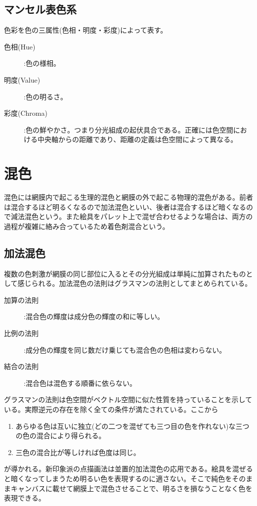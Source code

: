 \documentclass{jsarticle}
\begin{document}
		\subsection{マンセル表色系}
			色彩を色の三属性(色相・明度・彩度)によって表す。
			\begin{description}
				\item[色相(Hue)]:色の様相。
				\item[明度(Value)]:色の明るさ。
				\item[彩度(Chroma)]:色の鮮やかさ。つまり分光組成の起伏具合である。正確には色空間における中央軸からの距離であり、距離の定義は色空間によって異なる。
			\end{description}
	\section{混色}
		混色には網膜内で起こる生理的混色と網膜の外で起こる物理的混色がある。前者は混合するほど明るくなるので加法混色といい、後者は混合するほど暗くなるので減法混色という。また絵具をパレット上で混ぜ合わせるような場合は、両方の過程が複雑に絡み合っているため着色剤混合という。
		\subsection{加法混色}
			複数の色刺激が網膜の同じ部位に入るとその分光組成は単純に加算されたものとして感じられる。加法混色の法則はグラスマンの法則としてまとめられている。
			\begin{description}
				\item[加算の法則]:混合色の輝度は成分色の輝度の和に等しい。
				\item[比例の法則]:成分色の輝度を同じ数だけ乗じても混合色の色相は変わらない。
				\item[結合の法則]:混合色は混色する順番に依らない。
			\end{description}
			グラスマンの法則は色空間がベクトル空間に似た性質を持っていることを示している。実際逆元の存在を除く全ての条件が満たされている。ここから
			\begin{enumerate}
				\item あらゆる色は互いに独立(どの二つを混ぜても三つ目の色を作れない)な三つの色の混合により得られる。
				\item 三色の混合比が等しければ色度は同じ。
			\end{enumerate}
			が導かれる。新印象派の点描画法は並置的加法混色の応用である。絵具を混ぜると暗くなってしまうため明るい色を表現するのに適さない。そこで純色をそのままキャンバスに載せて網膜上で混色させることで、明るさを損なうことなく色を表現できる。
\end{document}
